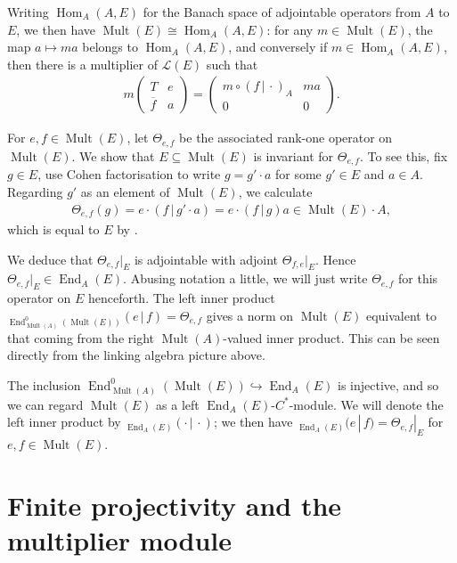 \documentclass[10pt,a4paper]{amsart}
\numberwithin{equation}{section}
\DeclareMathOperator{\End}{End} %
\DeclareMathOperator{\Mult}{Mult} %
\renewcommand{\L}{\mathcal{L}}
\newcommand{\ol}[1]{\overline{#1}} %
\begin{document}
Writing $\operatorname{Hom}_A(A, E)$ for the Banach space of adjointable operators from $A$ to $E$, we then have $\Mult(E) \cong \operatorname{Hom}_A(A, E)$: for any $m \in \Mult(E)$, the map $a \mapsto m a$ belongs to $\operatorname{Hom}_A(A, E)$, and conversely if $m \in \operatorname{Hom}_A(A, E)$, then there is a multiplier of $\L(E)$ such that
\begin{gather*}
m\begin{pmatrix} T & e\\ \ol{f} & a\end{pmatrix} = \begin{pmatrix} m\circ (f \,|\, \cdot)_A & ma \\ 0 & 0\end{pmatrix}.
\end{gather*}

For $e,f \in \Mult(E)$, let $\Theta_{e,f}$ be the associated rank-one operator on $\Mult(E)$. We show that $E \subseteq \Mult(E)$ is invariant for $\Theta_{e,f}$. To see this, f\/ix $g \in E$, use Cohen factorisation to write $g = g' \cdot a$ for some $g' \in E$ and $a \in A$. Regarding $g'$ as an element of $\Mult(E)$, we calculate
\begin{gather}\label{eq:E multE inv}
\Theta_{e,f}(g) = e \cdot (f \,|\, g'\cdot a) = e\cdot (f \,|\, g)a \in \Mult(E)\cdot A,
\end{gather}
which is equal to $E$ by \cite[Remark~3.2(a)]{AB}.

We deduce that $\Theta_{e,f}|_E$ is adjointable with adjoint $\Theta_{f,e}|_E$. Hence $\Theta_{e,f}|_E \in \End_A(E)$. Abusing notation a little, we will just write $\Theta_{e,f}$ for this operator on $E$ henceforth. The left inner product ${}_{\End_{\Mult(A)}^0(\Mult(E))}(e\,|\, f)=\Theta_{e,f}$
gives a norm on $\Mult(E)$ equivalent to that coming from the right $\Mult(A)$-valued inner product. This can be seen directly from the linking algebra picture above.

The inclusion $\End_{\Mult(A)}^0(\Mult(E))\hookrightarrow \End_A(E)$ is injective, and so we can regard $\Mult(E)$ as a left $\End_A(E)$-$C^*$-module. We will denote the left inner product by ${}_{\End_A(E)}(\cdot\,|\,\cdot)$; we then have ${}_{\End_A(E)}(e \,|\, f)
= \Theta_{e,f}|_E$ for $e,f \in \Mult(E)$.

\section{Finite projectivity and the multiplier module}
\end{document}
